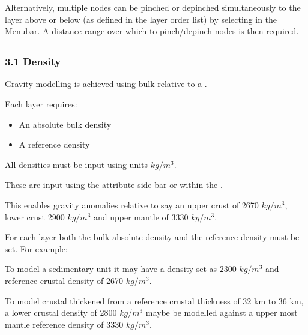 \documentclass[a4paper,10pt,english]{sphinxmanual}
\begin{document}
Alternatively, multiple nodes can be pinched or depinched simultaneously to the layer above or below
(as defined in the layer order list) by selecting  in the Menubar.
A distance range over which to pinch/depinch nodes is then required.


\subsection{}
\label{\detokenize{manual_layer_attributes:layer-attributes}}\label{\detokenize{manual_layer_attributes::doc}}
\begin{DUlineblock}{0em}
\item[] 
\end{DUlineblock}


\subsubsection{3.1 Density}
\label{\detokenize{manual_layer_attributes:density}}
Gravity modelling is achieved using bulk  relative to a .

Each layer requires:
\begin{itemize}
\item {} 
An absolute bulk density

\item {} 
A reference density

\end{itemize}

All densities must be input using units \(kg/m^3\).

These are input using the attribute side bar or within the .

This enables gravity anomalies relative to say an upper crust of 2670 \(kg/m^3\), lower crust 2900 \(kg/m^3\)
and upper mantle of 3330 \(kg/m^3\).

For each layer both the bulk absolute density and the reference density must be set. For example:

To model a sedimentary unit it may have a density set as 2300 \(kg/m^3\) and reference crustal
density of 2670 \(kg/m^3\).

To model crustal thickened from a reference crustal thickness of 32 km to 36 km, a lower crustal density of
2800 \(kg/m^3\) maybe be modelled against a upper most mantle reference density of 3330 \(kg/m^3\).
\end{document}
